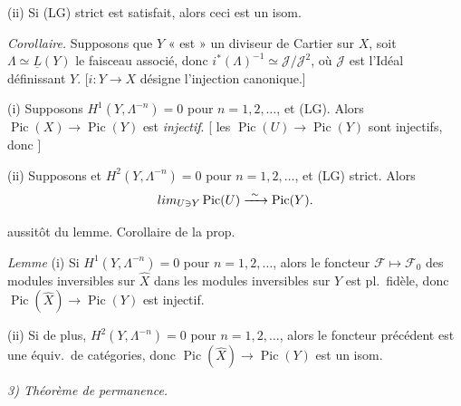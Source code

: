 \documentclass[11pt,a4paper]{article}
\begin{document}
(ii) Si (LG) strict est satisfait, alors ceci est un isom.

\emph{Corollaire.} Supposons que $Y$ « est » un diviseur de Cartier sur $X$, soit \struck{\ill{}} $\Lambda \simeq \underline{L}(Y)$ le faisceau  associé, donc $i^*(\Lambda)^{-1} \simeq \mathcal{J}/\mathcal{J}^2$, où $\mathcal{J}$ est l'Idéal définissant $Y$. [$i\colon Y \to X$ désigne l'injection canonique.]

(i) Supposons $H^1(Y, \Lambda^{-n}) = 0$ pour $n = 1, 2, \ldots$, et (LG). Alors $\operatorname{Pic}(X) \to \operatorname{Pic}(Y)$ est \emph{injectif}. [\ill{} \ill{} les \struck{\ill{} \ill{} \ill{}} $\operatorname{Pic}(U) \to \operatorname{Pic}(Y)$ sont injectifs, donc  \ill{}]

(ii) Supposons  et $H^2(Y, \Lambda^{-n}) = 0$ pour $n = 1, 2, \ldots$, et (LG) strict. Alors
\[
  \varinjlim_{U \ni Y} \operatorname{Pic}(U) \xrightarrow{\ \sim\ } \operatorname{Pic}(Y) .
\]

 aussitôt du \struck{\ill{}} \add{\ill{} \ill{}} lemme. Corollaire de la prop.\ \ill{} \ill{}

\emph{Lemme} (i) Si $H^1(Y, \Lambda^{-n}) = 0$ pour $n = 1, 2, \ldots$, alors  le foncteur $\mathcal{F} \mapsto \mathcal{F}_0$ des modules \struck{\ill{}} inversibles sur $\hat{X}$ dans les modules inversibles sur $Y$ est pl.\ fidèle, \struck{\ill{}} donc $\operatorname{Pic}(\hat{X}) \to \operatorname{Pic}(Y)$ est injectif.

(ii) Si de plus, $H^2(Y, \Lambda^{-n}) = 0$ pour $n = 1, 2, \ldots$, alors le foncteur précédent est une équiv.\ de catégories, donc $\operatorname{Pic}(\hat{X}) \to \operatorname{Pic}(Y)$ est un isom.

\emph{3) Théorème de permanence.}
\end{document}
